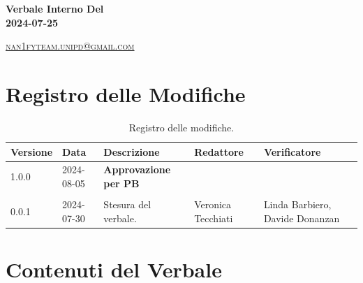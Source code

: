 \documentclass[8pt]{article}
\begin{document}
\begin{titlepage}
\begin{minipage}[t]{0.47\textwidth}
{		}
		\vspace{4mm}\vspace{4mm}
	\end{minipage}
	\vspace{4cm}
	\begin{center}
		\begin{flushright}
			{\fontsize{30pt}{52pt}\selectfont \textbf{Verbale Interno Del\\2024-07-25\\}} %
		\end{flushright}
		\vspace{3cm}
	\end{center}
	\vspace{8.5 cm}
	{\small \textsc{\href{mailto: nan1fyteam.unipd@gmail.com}{nan1fyteam.unipd@gmail.com}}}
\end{titlepage}
\pagestyle{mystyle}
\section*{Registro delle Modifiche}
\begin{table}[ht!]	
	\centering
	\begin{tabular}{p{1.2cm} p{2cm} p{5cm} p{3cm} p{3cm}}
		\toprule
		\textbf{Versione}& \textbf{Data} & \textbf{Descrizione} & \textbf{Redattore} & \textbf{Verificatore} \\
		\midrule
			1.0.0 & 2024-08-05 & \textbf{Approvazione per PB} & & \\\\
			0.0.1 & 2024-07-30 & Stesura del verbale. & Veronica Tecchiati & Linda Barbiero, Davide Donanzan 
 			\\ %

		\bottomrule
	\end{tabular}
	\caption{Registro delle modifiche.}
	\label{table:Registro delle modifiche}
\end{table}
\newpage
\tableofcontents
\clearpage
\newpage
\justifying
\section{Contenuti del Verbale}
\end{document}
